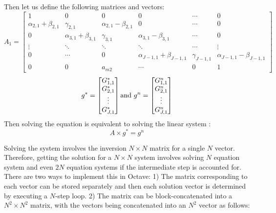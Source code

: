 \documentclass[11pt,a4paper]{article}
\begin{document}
Then let us define the following matrices and vectors:
   \[A_{1} =  \begin{bmatrix}
         1 & 0 & 0 & 0 & \cdots & 0\\
         \alpha_{2,1} + \beta_{2,1} & \gamma_{2,1} &\alpha_{2,1} - \beta_{2,1}& 0  & \cdots & 0\\ 
         0 & \alpha_{3,1} + \beta_{3,1} & \gamma_{3,1} &\alpha_{3,1} - \beta_{3,1} & \cdots & 0\\ 
         \vdots & \ddots & \ddots & \ddots & \cdots &  \vdots\\
         0 & \cdots & 0 &\alpha_{J-1,1} + \beta_{J-1,1} & \gamma_{J-1,1} &\alpha_{J-1,1} - \beta_{J-1,1} \\ 
         0 & 0  &a_{m2} & \cdots & 0  & 1 
     \end{bmatrix}\]
     \[
     g^{*} = 
     \begin{bmatrix}
         G^{*}_{1,1} \\
         G^{*}_{2,1} \\ 
         \vdots \\ 
         G^{*}_{J,1} 
     \end{bmatrix}
\\   \text{and }   
      g^{n} = \begin{bmatrix}
 		G^{n}_{1,1} \\
         G^{n}_{2,1} \\ 
         \vdots \\ 
         G^{n}_{J,1}  
     \end{bmatrix}
     \]
Then solving the equation is equivalent to solving the linear system : 
\[ A \times g^{*} =  g^{n} \] 

Solving the system involves the inversion $N \times N$ matrix for a single $N$ vector. Therefore, getting the solution for a $N \times N$ system involves solving $N$ equation system and even $2N$ equation systems if the intermediate step is accounted for. There are two ways to implement this in Octave: 1) The matrix corresponding to each vector can be stored separately and then each solution vector is determined by executing a $N$-step loop. 2) The matrix can be block-concatenated into a $N^2 \times N^2$ matrix, with the vectors being concatenated into an $N^2$ vector as follows: 
  
\end{document}
